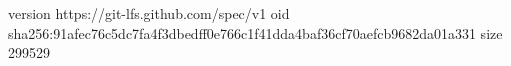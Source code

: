version https://git-lfs.github.com/spec/v1
oid sha256:91afec76c5dc7fa4f3dbedff0e766c1f41dda4baf36cf70aefcb9682da01a331
size 299529
